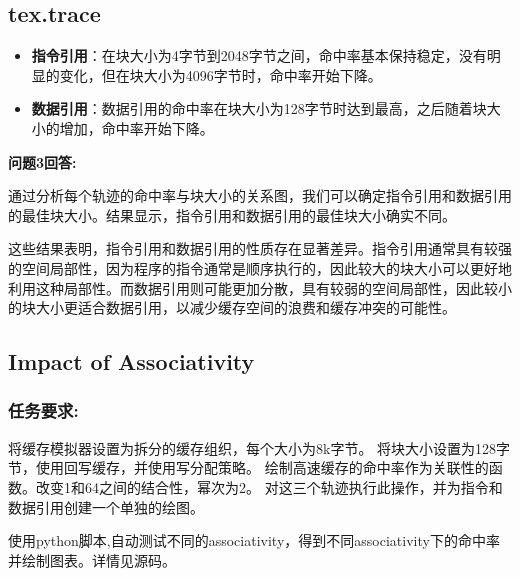 \documentclass[12pt,hyperref,a4paper,UTF8]{ctexart}
\begin{document}
\subsection{tex.trace}
\begin{itemize}
  \item \textbf{指令引用}：在块大小为4字节到2048字节之间，命中率基本保持稳定，没有明显的变化，但在块大小为4096字节时，命中率开始下降。
  \item \textbf{数据引用}：数据引用的命中率在块大小为128字节时达到最高，之后随着块大小的增加，命中率开始下降。
\end{itemize}



\textbf{问题3回答:}

通过分析每个轨迹的命中率与块大小的关系图，我们可以确定指令引用和数据引用的最佳块大小。结果显示，指令引用和数据引用的最佳块大小确实不同。

这些结果表明，指令引用和数据引用的性质存在显著差异。指令引用通常具有较强的空间局部性，因为程序的指令通常是顺序执行的，因此较大的块大小可以更好地利用这种局部性。而数据引用则可能更加分散，具有较弱的空间局部性，因此较小的块大小更适合数据引用，以减少缓存空间的浪费和缓存冲突的可能性。

\newpage

\subsection*{Impact of Associativity}
\subsubsection*{任务要求:}
将缓存模拟器设置为拆分的缓存组织，每个大小为8k字节。
将块大小设置为128字节，使用回写缓存，并使用写分配策略。
绘制高速缓存的命中率作为关联性的函数。改变1和64之间的结合性，幂次为2。
对这三个轨迹执行此操作，并为指令和数据引用创建一个单独的绘图。

使用python脚本,自动测试不同的associativity，得到不同associativity下的命中率并绘制图表。详情见源码。
\end{document}

